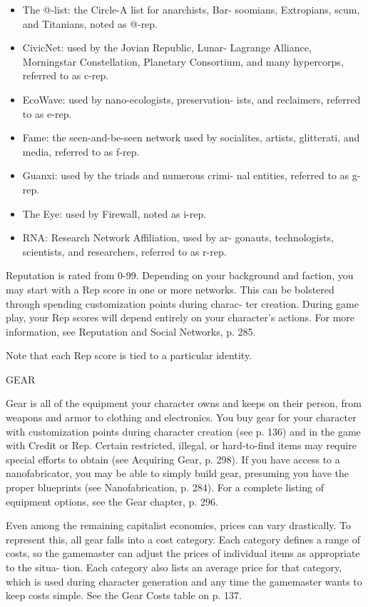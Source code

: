 \begin{itemize}
\item The @-list: the Circle-A list for anarchists, Bar- soomians,
  Extropians, scum, and Titanians, noted as @-rep.
\item CivicNet: used by the Jovian Republic, Lunar- Lagrange Alliance,
  Morningstar Constellation, Planetary Consortium, and many
  hypercorps, referred to as c-rep.
\item EcoWave: used by nano-ecologists, preservation- ists, and
  reclaimers, referred to as e-rep.
\item Fame: the seen-and-be-seen network used by socialites, artists,
  glitterati, and media, referred to as f-rep.
\item Guanxi: used by the triads and numerous crimi- nal entities,
  referred to as g-rep.
\item The Eye: used by Firewall, noted as i-rep.
\item RNA: Research Network Affiliation, used by ar- gonauts,
  technologists, scientists, and researchers, referred to as r-rep.
\end{itemize}

Reputation is rated from 0-99. Depending on your
background and faction, you may start with a Rep
score in one or more networks. This can be bolstered
through spending customization points during charac-
ter creation. During game play, your Rep scores will
depend entirely on your character's actions. For more
information, see Reputation and Social Networks, p.
285.

Note that each Rep score is tied to a particular
identity.

GEAR

Gear is all of the equipment your character owns
and keeps on their person, from weapons and armor
to clothing and electronics. You buy gear for your
character with customization points during character
creation (see p. 136) and in the game with Credit or
Rep. Certain restricted, illegal, or hard-to-find items
may require special efforts to obtain (see Acquiring
Gear, p. 298). If you have access to a nanofabricator,
you may be able to simply build gear, presuming you
have the proper blueprints (see Nanofabrication, p.
284). For a complete listing of equipment options, see
the Gear chapter, p. 296.

Even among the remaining capitalist economies,
prices can vary drastically. To represent this, all
gear falls into a cost category. Each category defines
a range of costs, so the gamemaster can adjust the
prices of individual items as appropriate to the situa-
tion. Each category also lists an average price for that
category, which is used during character generation
and any time the gamemaster wants to keep costs
simple. See the Gear Costs table on p. 137.

